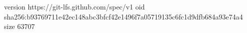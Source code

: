 version https://git-lfs.github.com/spec/v1
oid sha256:b93769711e42ec148abc3bfcf42e1496f7a05719135c6fc1d9dfb684a93e74a4
size 63707
